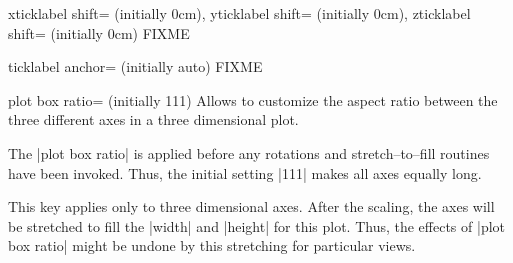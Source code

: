 \begin{pgfplotskeylist}{%
	xticklabel shift= (initially 0cm),%
	yticklabel shift= (initially 0cm),%
	zticklabel shift= (initially 0cm)}
	FIXME
\end{pgfplotskeylist}

\begin{pgfplotsxykey}{\x ticklabel anchor= (initially auto)}
	FIXME
\end{pgfplotsxykey}

\begin{pgfplotskey}{plot box ratio= (initially {1}{1}{1})}
	Allows to customize the aspect ratio between the three different axes in a three dimensional plot.

	The |plot box ratio| is applied before any rotations and stretch--to--fill routines have been invoked. Thus, the initial setting |{1}{1}{1}| makes all axes equally long.

\pgfplotsexpensiveexample
\begin{codeexample}[]
\end{codeexample}

\pgfplotsexpensiveexample
\begin{codeexample}[]
\end{codeexample}

	This key applies only to three dimensional axes. After the scaling, the axes will be stretched to fill the |width| and |height| for this plot. Thus, the effects of |plot box ratio| might be undone by this stretching for particular views.
\end{pgfplotskey}